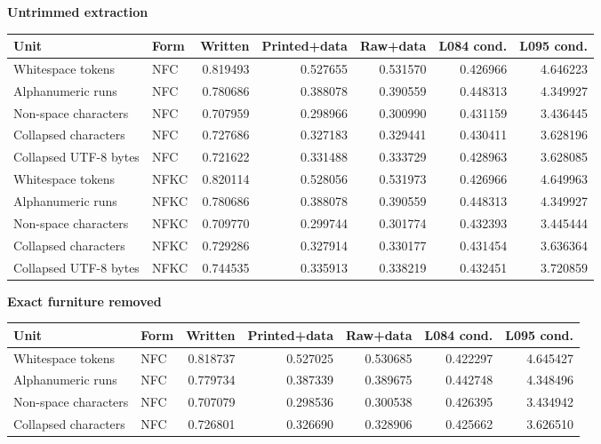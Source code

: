 \documentclass[a4paper,11pt]{article}
\begin{document}
{\fontsize{8.4}{10}\selectfont \par\vspace{6pt}\textbf{Untrimmed extraction}\par\smallskip\begin{tabular}{@{}llrrrrr@{}}\toprule Unit & Form & Written & Printed+data & Raw+data & L084 cond. & L095 cond.\\\midrule Whitespace tokens & NFC & 0.819493 & 0.527655 & 0.531570 & 0.426966 & 4.646223 \\
Alphanumeric runs & NFC & 0.780686 & 0.388078 & 0.390559 & 0.448313 & 4.349927 \\
Non-space characters & NFC & 0.707959 & 0.298966 & 0.300990 & 0.431159 & 3.436445 \\
Collapsed characters & NFC & 0.727686 & 0.327183 & 0.329441 & 0.430411 & 3.628196 \\
Collapsed UTF-8 bytes & NFC & 0.721622 & 0.331488 & 0.333729 & 0.428963 & 3.628085 \\
Whitespace tokens & NFKC & 0.820114 & 0.528056 & 0.531973 & 0.426966 & 4.649963 \\
Alphanumeric runs & NFKC & 0.780686 & 0.388078 & 0.390559 & 0.448313 & 4.349927 \\
Non-space characters & NFKC & 0.709770 & 0.299744 & 0.301774 & 0.432393 & 3.445444 \\
Collapsed characters & NFKC & 0.729286 & 0.327914 & 0.330177 & 0.431454 & 3.636364 \\
Collapsed UTF-8 bytes & NFKC & 0.744535 & 0.335913 & 0.338219 & 0.432451 & 3.720859 \\\bottomrule\end{tabular}
\par\vspace{6pt}\textbf{Exact furniture removed}\par\smallskip\begin{tabular}{@{}llrrrrr@{}}\toprule Unit & Form & Written & Printed+data & Raw+data & L084 cond. & L095 cond.\\\midrule Whitespace tokens & NFC & 0.818737 & 0.527025 & 0.530685 & 0.422297 & 4.645427 \\
Alphanumeric runs & NFC & 0.779734 & 0.387339 & 0.389675 & 0.442748 & 4.348496 \\
Non-space characters & NFC & 0.707079 & 0.298536 & 0.300538 & 0.426395 & 3.434942 \\
Collapsed characters & NFC & 0.726801 & 0.326690 & 0.328906 & 0.425662 & 3.626510 \\

\end{tabular}}
\end{document}
